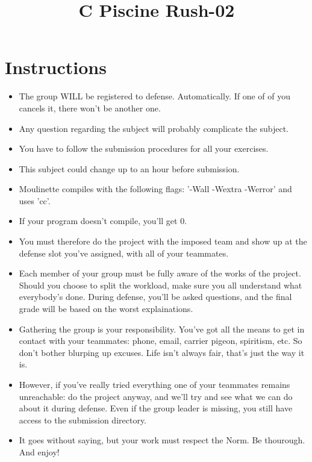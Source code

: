 \documentclass{article}
\title{C Piscine Rush-02}
\author{}
\date{}
\begin{document}
\maketitle
\tableofcontents
\newpage

\section{Instructions}

\begin{itemize}
    \item The group WILL be registered to defense. Automatically. If one of of you cancels it, there won't be another one.
    \item Any question regarding the subject will probably complicate the subject.
    \item You have to follow the submission procedures for all your exercises.
    \item This subject could change up to an hour before submission.
    \item Moulinette compiles with the following flags: '-Wall -Wextra -Werror' and uses 'cc'.
    \item If your program doesn't compile, you'll get 0.
    \item You must therefore do the project with the imposed team and show up at the defense slot you've assigned, with all of your teammates.
    \item Each member of your group must be fully aware of the works of the project. Should you choose to split the workload, make sure you all understand what everybody's done. During defense, you'll be asked questions, and the final grade will be based on the worst explainations.
    \item Gathering the group is your responsibility. You've got all the means to get in contact with your teammates: phone, email, carrier pigeon, spiritism, etc. So don't bother blurping up excuses. Life isn't always fair, that's just the way it is.
    \item However, if you've really tried everything one of your teammates remains unreachable: do the project anyway, and we'll try and see what we can do about it during defense. Even if the group leader is missing, you still have access to the submission directory.
    \item It goes without saying, but your work must respect the Norm. Be thourough. And enjoy!
\end{itemize}
\end{document}

